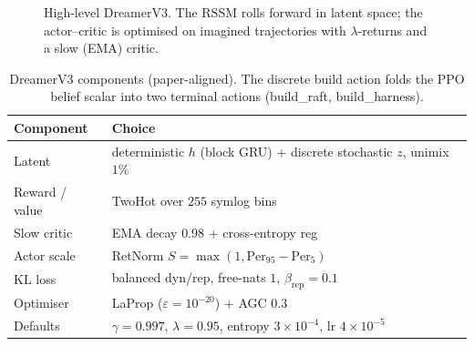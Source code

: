 \documentclass[11pt]{article}
\begin{document}
\begin{figure}[H]
\centering
{}
\caption{High-level DreamerV3. The RSSM rolls forward in latent space; the
actor--critic is optimised on imagined trajectories with $\lambda$-returns and
a slow (EMA) critic.}
\label{fig:dreamer}
\end{figure}

\begin{table}[H]
\centering\small
\begin{tabular}{ll}
\toprule
\textbf{Component} & \textbf{Choice} \\
\midrule
Latent           & deterministic $h$ (block GRU) + discrete stochastic $z$, unimix $1\%$ \\
Reward / value   & TwoHot over $255$ symlog bins \\
Slow critic      & EMA decay $0.98$ + cross-entropy reg \\
Actor scale      & RetNorm $S=\max(1,\mathrm{Per}_{95}-\mathrm{Per}_{5})$ \\
KL loss          & balanced dyn/rep, free-nats $1$, $\beta_{\text{rep}}{=}0.1$ \\
Optimiser        & LaProp ($\varepsilon{=}10^{-20}$) + AGC $0.3$ \\
Defaults         & $\gamma{=}0.997$, $\lambda{=}0.95$, entropy $3{\times}10^{-4}$, lr $4{\times}10^{-5}$ \\
\bottomrule
\end{tabular}
\caption{DreamerV3 components (paper-aligned). The discrete build action folds
the PPO belief scalar into two terminal actions (\textsf{build\_raft},
\textsf{build\_harness}).}
\label{tab:dreamer}
\end{table}
\end{document}
